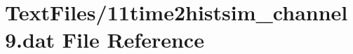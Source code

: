 \hypertarget{11time2histsim__channel9_8dat}{}\section{Text\+Files/11time2histsim\+\_\+channel9.dat File Reference}
\label{11time2histsim__channel9_8dat}
